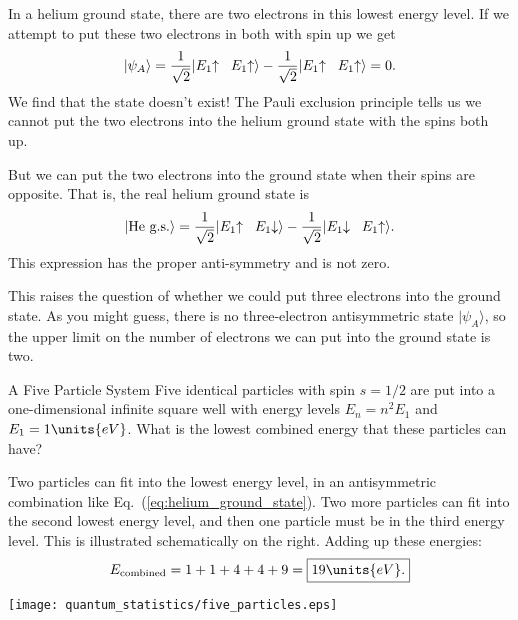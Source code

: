 In a helium ground state, there are two electrons in this lowest
energy level.  If we attempt to put these two electrons in both with
spin up we get
\begin{equation}
  |\psi_A\rangle = \frac{1}{\sqrt 2}|E_1\hspace{-1mm}\uparrow\hspace{2mm} 
  E_1\hspace{-1mm}\uparrow\rangle 
  - \frac{1}{\sqrt 2}|E_1\hspace{-1mm}\uparrow\hspace{2mm} 
  E_1\hspace{-1mm}\uparrow\rangle 
  = 0.
\end{equation}
We find that the state doesn't exist!  The Pauli exclusion principle
tells us we cannot put the two electrons into the helium ground state with
the spins both up.

But we can put the two electrons into the ground state when their spins
are opposite.  That is, the real helium ground state is
\begin{equation}
  |\text{He g.s.}\rangle = 
  \frac{1}{\sqrt 2}|E_1\hspace{-1mm}\uparrow\hspace{2mm} 
    E_1\hspace{-1mm}\downarrow\rangle -
  \frac{1}{\sqrt 2}|E_1\hspace{-1mm}\downarrow\hspace{2mm} 
    E_1\hspace{-1mm}\uparrow\rangle.
    \label{eq:helium_ground_state}
\end{equation}
This expression has the proper anti-symmetry and is not zero.

This raises the question of whether we could put three electrons into
the ground state.  As you might guess, there is no three-electron
antisymmetric state $|\psi_A\rangle$, so the upper limit on the number
of electrons we can put into the ground state is two.

\begin{example}{A Five Particle System}
\label{example:five_particles}
Five identical particles with spin $s=1/2$ are put into a
one-dimensional infinite square well with energy levels $E_n=n^2 E_1$
and $E_1=1\units{eV}$.  What is the lowest combined energy that these
particles can have?

\begin{minipage}{3.4in}
\solution Two particles can fit into the lowest energy level, in an 
antisymmetric combination like Eq.~(\ref{eq:helium_ground_state}).  Two
more particles can fit into the second lowest energy level, and then one
particle must be in the third energy level.  This is illustrated
schematically on the right.  Adding up these energies:
\[
E_\text{combined} = 1 + 1 + 4 + 4 + 9 = \boxed{19\units{eV}.}
\]
\end{minipage}
\hspace{0.2in}
\begin{minipage}{1.3in}
\texttt{[image: quantum\_statistics/five\_particles.eps]}
\end{minipage}

\end{example}

